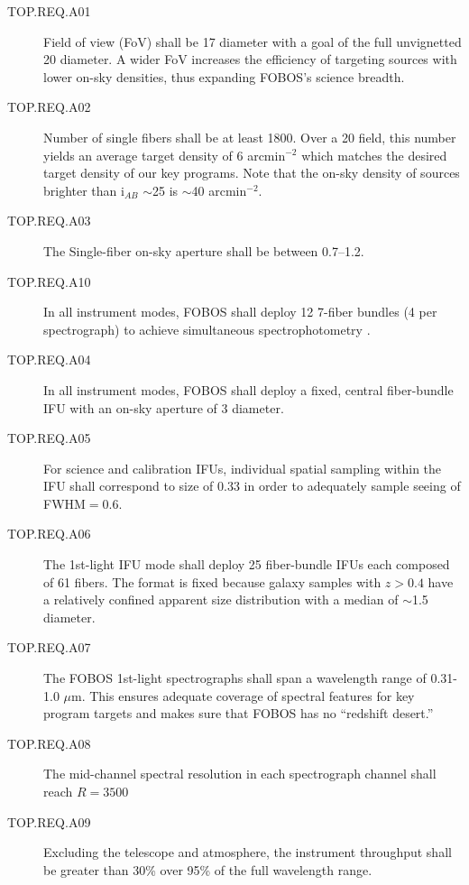 \documentclass[11pt,a4paper,twoside,onecolumn,openany,final,oldfontcommands]{memoir}
\begin{document}
\begin{description}

\item [TOP.REQ.A01] Field of view (FoV) shall be 17\arcmin{} diameter with a goal of the full unvignetted 20\arcmin{} diameter.  A wider FoV increases the efficiency of targeting sources with lower on-sky densities, thus expanding FOBOS's science breadth.

\item [TOP.REQ.A02] Number of single fibers shall be at least 1800.  Over a 20\arcmin{} field, this number yields an average target density of 6 arcmin$^{-2}$ which matches the desired target density of our key programs.  Note that the on-sky density of sources brighter than i$_{AB}$ $\sim$25 is $\sim$40 arcmin$^{-2}$.

\item [TOP.REQ.A03] The Single-fiber on-sky aperture shall be between 0.7--1.2\arcsec{}.

\item [TOP.REQ.A10] In all instrument modes, FOBOS shall deploy 12 7-fiber bundles (4 per spectrograph) to achieve simultaneous spectrophotometry \citep[see][]{yan16}.  

\item [TOP.REQ.A04] In all instrument modes, FOBOS shall deploy a fixed, central fiber-bundle IFU with an on-sky aperture of 3\arcsec{} diameter.

\item [TOP.REQ.A05] For science and calibration IFUs, individual spatial sampling within the IFU shall correspond to size of 0.33\arcsec{} in order to adequately sample seeing of FWHM$ = 0.6$\arcsec.

\item [TOP.REQ.A06] The 1st-light IFU mode shall deploy 25 fiber-bundle IFUs each composed of 61 fibers.  The format is fixed because galaxy samples with $z > 0.4$ have a relatively confined apparent size distribution with a median of  $\sim$1.5\arcsec{} diameter.

\item [TOP.REQ.A07] The FOBOS 1st-light spectrographs shall span a wavelength range of 0.31-1.0 $\mu$m.  This ensures adequate coverage of spectral features for key program targets and makes sure that FOBOS has no ``redshift desert.''

\item [TOP.REQ.A08] The mid-channel spectral resolution in each spectrograph channel shall reach $R = 3500$

\item [TOP.REQ.A09] Excluding the telescope and atmosphere, the instrument throughput shall be greater than 30\% over 95\% of the full wavelength range.

\end{description}
\end{document}
